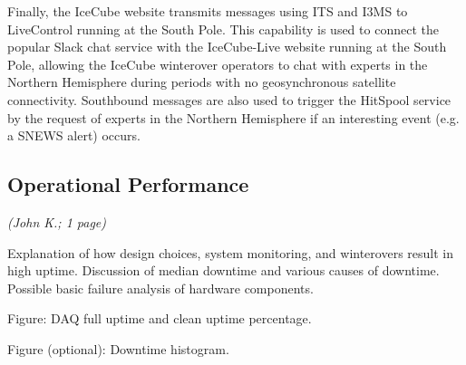 Finally, the IceCube website transmits messages using ITS and I3MS to LiveControl running at the South Pole.  This capability is used to connect
the popular Slack chat service with the IceCube-Live website running at the South Pole, allowing the IceCube winterover operators to chat with
experts in the Northern Hemisphere during periods with no geosynchronous satellite connectivity.  Southbound messages are also used to trigger
the HitSpool service by the request of experts in the Northern Hemisphere if an interesting event (e.g. a SNEWS alert) occurs.

\subsection{Operational Performance}
\textsl{(John K.; 1 page)}

Explanation of how design choices, system monitoring, and winterovers result in
high uptime.  Discussion of median downtime and various causes of downtime.
Possible basic failure analysis of hardware components.  

Figure: DAQ full uptime and clean uptime percentage.

Figure (optional): Downtime histogram.  
